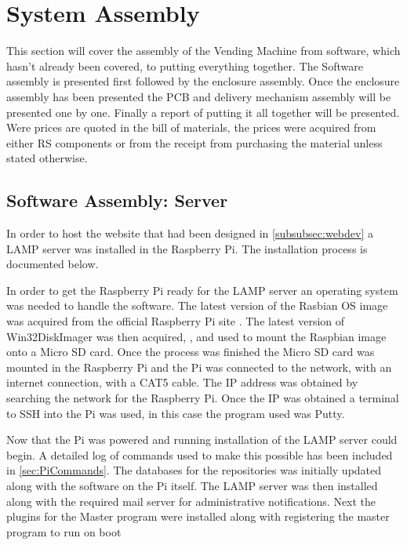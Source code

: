 \documentclass[a4paper,11pt]{article}
\numberwithin{figure}{section}
\numberwithin{table}{section}
\begin{document}
\newpage

\section{System Assembly}
This section will cover the assembly of the Vending Machine from software, which hasn't already been covered, to putting everything together. The Software assembly is presented first followed by the enclosure assembly. Once the enclosure assembly has been presented the PCB and delivery mechanism assembly will be presented one by one. Finally a report of putting it all together will be presented. Were prices are quoted in the bill of materials, the prices were acquired from either RS components \cite{rsonline} or from the receipt from purchasing the material unless stated otherwise.

\subsection{Software Assembly: Server}

In order to host the website that had been designed in \autoref{subsubsec:webdev} a LAMP server was installed in the Raspberry Pi. The installation process is documented below.

In order to get the Raspberry Pi ready for the LAMP server an operating system was needed to handle the software. The latest version of the Rasbian OS image was acquired from the official Raspberry Pi site \cite{raspbian}. The latest version of Win32DiskImager was then acquired, \cite{diskimage}, and used to mount the Raspbian image onto a Micro SD card. Once the process was finished the Micro SD card was mounted in the Raspberry Pi and the Pi was connected to the network, with an internet connection, with a CAT5 cable. The IP address was obtained by searching the network for the Raspberry Pi. Once the IP was obtained a terminal to SSH into the Pi was used, in this case the program used was Putty.

Now that the Pi was powered and running installation of the LAMP server could begin. A detailed log of commands used to make this possible has been included in \autoref{sec:PiCommands}. The databases for the repositories was initially updated along with the software on the Pi itself. The LAMP server was then installed along with the required mail server for administrative notifications. Next the plugins for the Master program were installed along with registering the master program to run on boot
\end{document}
